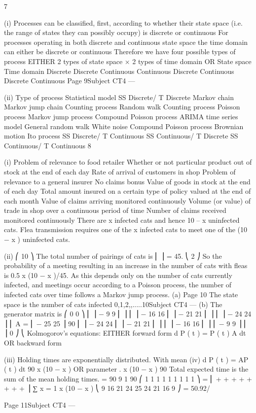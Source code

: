 7
\item (i)
Processes can be classified, first, according to whether their state space (i.e.
the range of states they can possibly occupy) is discrete or continuous
For processes operating in both discrete and continuous state space the time
domain can either be discrete or continuous
Therefore we have four possible types of process
EITHER
2 types of state space × 2 types of time domain
OR
State space Time domain
Discrete
Discrete
Continuous
Continuous Discrete
Continuous
Discrete
Continuous
Page 9Subject CT4 — %
\item (ii)
Type of process Statistical model
SS Discrete/
T Discrete Markov chain
Markov jump chain
Counting process
Random walk
Counting process
Poisson process
Markov jump process
Compound Poisson
process
ARIMA time series
model
General random walk
White noise
Compound Poisson
process
Brownian motion
Ito process
SS Discrete/
T Continuous
SS Continuous/
T Discrete
SS Continuous/
T Continuous
8
\item (i)
Problem of relevance
to food retailer
Whether or not
particular product out
of stock at the end of
each day
Rate of arrival of
customers in shop Problem of relevance
to a general insurer
No claims bonus
Value of goods in
stock at the end of
each day Total amount insured
on a certain type of
policy valued at the
end of each month
Value of claims
arriving monitored
continuously
Volume (or value) of
trade in shop over a
continuous period of
time
Number of claims
received monitored
continuously
There are x infected cats and hence 10 – x uninfected cats.
Flea transmission requires one of the x infected cats to meet one of the (10 − x )
uninfected cats.
\item (ii)
⎛ 10 ⎞
The total number of pairings of cats is ⎜ ⎟ = 45.
⎝ 2 ⎠
So the probability of a meeting resulting in an increase in the number of cats
with fleas is 0.5 x (10 − x )/45.
As this depends only on the number of cats currently infected, and meetings
occur according to a Poisson process, the number of infected cats over time
follows a Markov jump process.
(a)
Page 10
The state space is the number of cats infected {0,1,2,,.....10}Subject CT4 — %
(b)
The generator matrix is
⎛ 0 0
⎞
⎜
⎟
− 9 9
⎜
⎟
⎜
⎟
− 16 16
⎜
⎟
− 21 21
⎜
⎟
⎜
⎟
− 24 24
⎟
\mu ⎜
A = ⎜
− 25 25
⎟
90 ⎜
⎟
− 24 24
⎜
⎟
− 21 21
⎜
⎟
⎜
⎟
− 16 16
⎜
⎟
⎜
− 9 9 ⎟
⎜
⎟
0 ⎠
⎝
Kolmogorov’s equations:
EITHER
forward form
d
P ( t ) = P ( t ) A
dt
OR
backward form
\item (iii)
Holding times are exponentially distributed.
With mean
(iv)
d
P ( t ) = AP ( t )
dt
90
\mu x (10 − x )
OR parameter
.
\mu x (10 − x )
90
Total expected time is the sum of the mean holding times.
=
90 9
1
90 ⎛ 1 1 1
1
1
1
1 1 1 ⎞
= ⎜ + + +
+
+
+ + + ⎟
∑
\mu x = 1 x (10 − x ) \mu ⎝ 9 16 21 24 25 24 21 16 9 ⎠
= 50.92/

\mu
Page 11Subject CT4 — %

